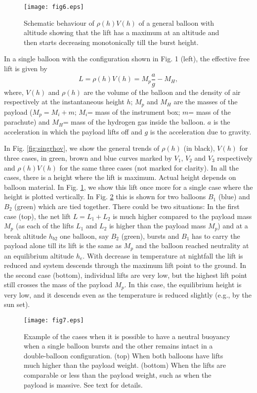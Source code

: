 \begin{figure}[h]
  \centering
  \texttt{[image: fig6.eps]}
  \caption{Schematic behaviour of $\rho(h) V(h)$ of a general balloon with altitude showing that the lift
has a maximum at an altitude and then starts decreasing monotonically till the burst height.}
   \label{fig:singbal}
\end{figure}

In a single balloon with the configuration shown in Fig. 1 (left), the effective free
lift is given by
$$
L=\rho(h) V(h)=M_p \frac{a}{g} - M_H,
$$
where, $V(h)$ and $\rho(h)$ are the volume of the balloon 
and the density of air respectively at the instantaneous height $h$;
$M_p$ and $M_H$ are the masses of the payload ($M_p=M_i+m$;
$M_i$= mass of the instrument box; $m$= mass of the parachute) 
and $M_H$= mass of the hydrogen gas inside the balloon. $a$ is the 
acceleration in which the payload lifts off and $g$ is the acceleration due to gravity.

In Fig. \ref{fig:singrhov}, we show the general trends of
$\rho(h)$ (in black), $V(h)$ for three cases, in green, brown and blue curves
marked by $V_1$, $V_2$ and $V_3$ respectively and $\rho(h) V(h) $ for the 
same three cases (not marked for clarity). In all the cases, there is a height where the lift is 
maximum. Actual height depends on balloon material.  
In Fig. \ref{fig:singbal}, we show this lift once more for a single case
where the height is plotted vertically. In Fig. \ref{fig:dbal} this is shown for
two balloons $B_1$ (blue) and $B_2$ (green)
which are tied together. There could be two situations: In the first case (top),
the net lift $L=L_1+L_2$ is much higher compared to the payload mass $M_p$
(as each of the lifts $L_1$ and $L_2$ is higher than the payload mass $M_p$)
and at a break altitude $h_{b2}$ one balloon, say $B_2$ (green), bursts and $B_1$ has to 
carry the payload alone till its lift is the same as $M_p$ and the balloon reached 
neutrality at an equilibrium altitude $h_e$. With decrease in temperature at nightfall
the lift is reduced and system descends through the maximum lift point to the ground. 
In the second case (bottom), individual lifts are very low, but the highest lift
point still crosses the mass of the payload $M_p$. In this case, the equilibrium height
is very low, and it descends even as the temperature is reduced slightly
(e.g., by the sun set). 

\begin{figure}[h]
  \centering
  \texttt{[image: fig7.eps]}
  \caption{Example of the cases when it is possible to have a neutral buoyancy 
when a single balloon bursts and the other remains intact in a double-balloon
configuration. (top) When both balloons have lifts  much higher than the payload
weight. (bottom) When the lifts are comparable or less than the payload weight,
such as when the payload is massive. See text for details.}
   \label{fig:dbal}
\end{figure}

